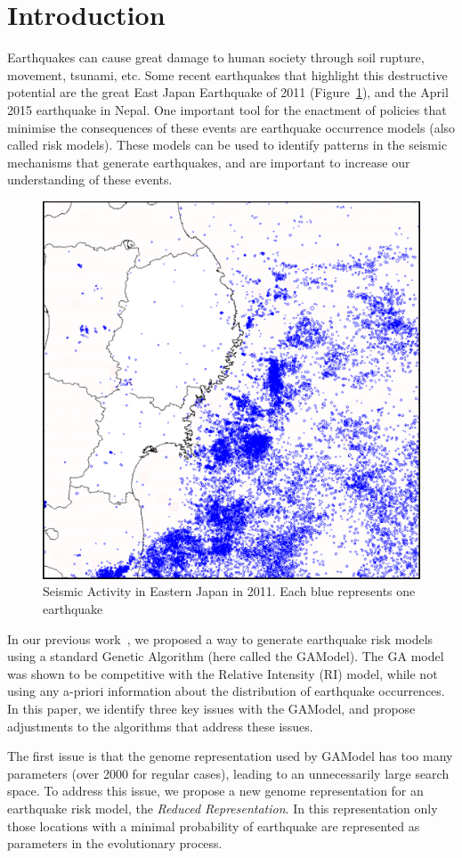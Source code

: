 \section{Introduction}\label{intro}

Earthquakes can cause great damage to human society through soil
rupture, movement, tsunami, etc. Some recent earthquakes that
highlight this destructive potential are the great East Japan
Earthquake of 2011 (Figure~\ref{GreatEastJapan}), and the
April 2015 earthquake in Nepal. One important tool for the enactment
of policies that minimise the consequences of these events are
earthquake occurrence models (also called risk models). These models
can be used to identify patterns in the seismic mechanisms that
generate earthquakes, and are important to increase our understanding
of these events.


\begin{figure}[]
\centering
\includegraphics[width=.45\textwidth]{img/earthquakes2011.png}
\caption{Seismic Activity in Eastern Japan in 2011. Each blue
  represents one earthquake}
\label{GreatEastJapan}
\end{figure}

In our previous work~\cite{ecta14}, we proposed a way to generate
earthquake risk models using a standard Genetic Algorithm (here called
the GAModel). The GA model was shown to be competitive with the
Relative Intensity (RI) model, while not using any a-priori
information about the distribution of earthquake occurrences. In this
paper, we identify three key issues with the GAModel, and propose
adjustments to the algorithms that address these issues.

The first issue is that the genome representation used by GAModel has
too many parameters (over 2000 for regular cases), leading to an
unnecessarily large search space. To address this issue, we propose a
new genome representation for an earthquake risk model, the
\emph{Reduced Representation}. In this representation only those
locations with a minimal probability of earthquake are represented as
parameters in the evolutionary process.

